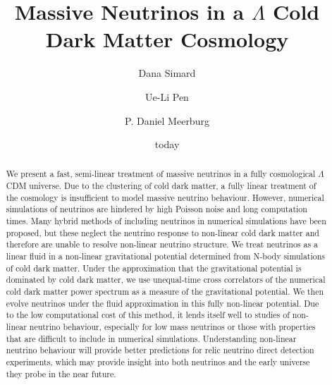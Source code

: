 \documentclass{aastex}
\begin{document}
\title{Massive Neutrinos in a $\Lambda$ Cold Dark Matter Cosmology}
\date{today}

\author{ Dana Simard }

\author{ Ue-Li Pen }

\author{P. Daniel Meerburg}

\begin{abstract}
We present a fast, semi-linear treatment of massive
neutrinos in a fully cosmological $\Lambda$CDM universe.
Due to the clustering of cold dark matter, a fully linear
treatment of the cosmology is insufficient to model massive neutrino
behaviour.  
However, numerical simulations of neutrinos are hindered
by high Poisson noise and long computation times.
Many hybrid methods of including neutrinos in numerical
simulations have been proposed, but these neglect the neutrino
response to non-linear cold dark matter %
and therefore are unable to
resolve non-linear neutrino structure. 
We treat neutrinos as a linear fluid in a non-linear gravitational
potential determined from N-body simulations of cold dark matter.
Under the approximation that the gravitational potential is dominated
by cold dark matter, we use unequal-time cross correlators of the
numerical cold dark matter power
spectrum as a measure of the gravitational potential. 
We then evolve neutrinos under the fluid approximation 
in this fully non-linear potential.
Due to the low computational cost of this method, it lends itself well
to studies of non-linear neutrino behaviour, especially for low mass
neutrinos or those with properties that are difficult to
include in numerical simulations.  Understanding non-linear neutrino
behaviour will provide better predictions for relic neutrino
direct detection experiments, 
which may provide insight into both 
neutrinos and the early universe they probe in the near future.
\vspace{10cm}
\end{abstract}
\end{document}
